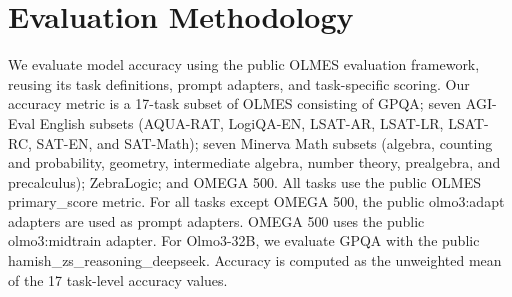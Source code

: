\documentclass{article} %
\begin{document}





\section{Evaluation Methodology}

We evaluate model accuracy using the public OLMES evaluation framework, reusing its task definitions, prompt adapters, and task-specific scoring. Our accuracy metric is a 17-task subset of OLMES consisting of GPQA; seven AGI-Eval English subsets (AQUA-RAT, LogiQA-EN, LSAT-AR, LSAT-LR, LSAT-RC, SAT-EN, and SAT-Math); seven Minerva Math subsets (algebra, counting and probability, geometry, intermediate algebra, number theory, prealgebra, and precalculus); ZebraLogic; and OMEGA 500. All tasks use the public OLMES primary\_score metric. For all tasks except OMEGA 500, the public olmo3:adapt adapters are used as prompt adapters. OMEGA 500 uses the public olmo3:midtrain adapter. For Olmo3-32B, we evaluate GPQA with the public hamish\_zs\_reasoning\_deepseek. Accuracy is computed as the unweighted mean of the 17 task-level accuracy values. 
\end{document}
